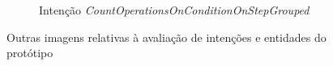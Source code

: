 \begin{figure}[!ht]
\begin{subfigure}{.48\textwidth}
        \caption{Intenção \textit{CountOperationsOnConditionOnStepGrouped}}
     \end{subfigure}
\caption{Outras imagens relativas à avaliação de intenções e entidades do protótipo}
\label{fig:nlcomprehesion_others}
\end{figure}